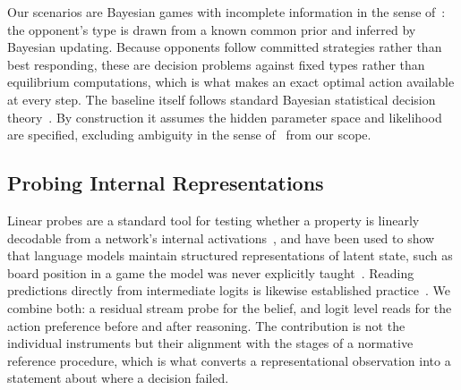 Our scenarios are Bayesian games with incomplete information in the sense
of~\citet{VERIFY_harsanyi}: the opponent's type is drawn from a known common
prior and inferred by Bayesian updating. Because opponents follow committed
strategies rather than best responding, these are decision problems against
fixed types rather than equilibrium computations, which is what makes an exact
optimal action available at every step. The baseline itself follows standard
Bayesian statistical decision theory~\citep{VERIFY_wald, VERIFY_savage}. By
construction it assumes the hidden parameter space and likelihood are
specified, excluding ambiguity in the sense
of~\citet{VERIFY_ellsberg} from our scope.

\subsection{Probing Internal Representations}

Linear probes are a standard tool for testing whether a property is linearly
decodable from a network's internal
activations~\citep{VERIFY_alain_bengio, VERIFY_belinkov_survey}, and have been
used to show that language models maintain structured representations of
latent state, such as board position in a game the model was never explicitly
taught~\citep{VERIFY_othello}. Reading predictions directly from intermediate
logits is likewise established practice~\citep{VERIFY_logit_lens}. We combine
both: a residual stream probe for the belief, and logit level reads for the
action preference before and after reasoning. The contribution is not the
individual instruments but their alignment with the stages of a normative
reference procedure, which is what converts a representational observation into
a statement about where a decision failed.
